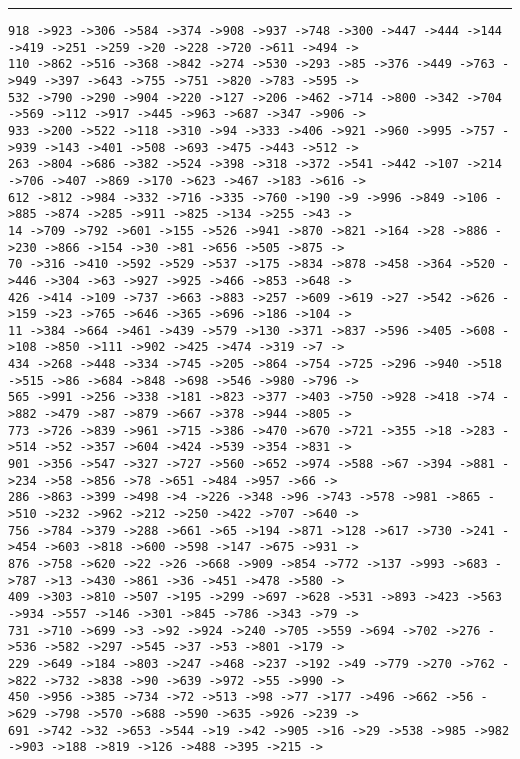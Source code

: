 \documentclass[letter, 12pt]{article}
\newenvironment{question}[1]{%
    \vspace{.2in}%
        \noindent{\bf #1}%
    \vspace{0.3em} \hrule \vspace{.1in}%
}{}
\begin{document}
\begin{question}{\large Appendix}
\begin{lstlisting}[style=CStyle]
918 ->923 ->306 ->584 ->374 ->908 ->937 ->748 ->300 ->447 ->444 ->144 ->419 ->251 ->259 ->20 ->228 ->720 ->611 ->494 ->
110 ->862 ->516 ->368 ->842 ->274 ->530 ->293 ->85 ->376 ->449 ->763 ->949 ->397 ->643 ->755 ->751 ->820 ->783 ->595 ->
532 ->790 ->290 ->904 ->220 ->127 ->206 ->462 ->714 ->800 ->342 ->704 ->569 ->112 ->917 ->445 ->963 ->687 ->347 ->906 ->
933 ->200 ->522 ->118 ->310 ->94 ->333 ->406 ->921 ->960 ->995 ->757 ->939 ->143 ->401 ->508 ->693 ->475 ->443 ->512 ->
263 ->804 ->686 ->382 ->524 ->398 ->318 ->372 ->541 ->442 ->107 ->214 ->706 ->407 ->869 ->170 ->623 ->467 ->183 ->616 ->
612 ->812 ->984 ->332 ->716 ->335 ->760 ->190 ->9 ->996 ->849 ->106 ->885 ->874 ->285 ->911 ->825 ->134 ->255 ->43 ->
14 ->709 ->792 ->601 ->155 ->526 ->941 ->870 ->821 ->164 ->28 ->886 ->230 ->866 ->154 ->30 ->81 ->656 ->505 ->875 ->
70 ->316 ->410 ->592 ->529 ->537 ->175 ->834 ->878 ->458 ->364 ->520 ->446 ->304 ->63 ->927 ->925 ->466 ->853 ->648 ->
426 ->414 ->109 ->737 ->663 ->883 ->257 ->609 ->619 ->27 ->542 ->626 ->159 ->23 ->765 ->646 ->365 ->696 ->186 ->104 ->
11 ->384 ->664 ->461 ->439 ->579 ->130 ->371 ->837 ->596 ->405 ->608 ->108 ->850 ->111 ->902 ->425 ->474 ->319 ->7 ->
434 ->268 ->448 ->334 ->745 ->205 ->864 ->754 ->725 ->296 ->940 ->518 ->515 ->86 ->684 ->848 ->698 ->546 ->980 ->796 ->
565 ->991 ->256 ->338 ->181 ->823 ->377 ->403 ->750 ->928 ->418 ->74 ->882 ->479 ->87 ->879 ->667 ->378 ->944 ->805 ->
773 ->726 ->839 ->961 ->715 ->386 ->470 ->670 ->721 ->355 ->18 ->283 ->514 ->52 ->357 ->604 ->424 ->539 ->354 ->831 ->
901 ->356 ->547 ->327 ->727 ->560 ->652 ->974 ->588 ->67 ->394 ->881 ->234 ->58 ->856 ->78 ->651 ->484 ->957 ->66 ->
286 ->863 ->399 ->498 ->4 ->226 ->348 ->96 ->743 ->578 ->981 ->865 ->510 ->232 ->962 ->212 ->250 ->422 ->707 ->640 ->
756 ->784 ->379 ->288 ->661 ->65 ->194 ->871 ->128 ->617 ->730 ->241 ->454 ->603 ->818 ->600 ->598 ->147 ->675 ->931 ->
876 ->758 ->620 ->22 ->26 ->668 ->909 ->854 ->772 ->137 ->993 ->683 ->787 ->13 ->430 ->861 ->36 ->451 ->478 ->580 ->
409 ->303 ->810 ->507 ->195 ->299 ->697 ->628 ->531 ->893 ->423 ->563 ->934 ->557 ->146 ->301 ->845 ->786 ->343 ->79 ->
731 ->710 ->699 ->3 ->92 ->924 ->240 ->705 ->559 ->694 ->702 ->276 ->536 ->582 ->297 ->545 ->37 ->53 ->801 ->179 ->
229 ->649 ->184 ->803 ->247 ->468 ->237 ->192 ->49 ->779 ->270 ->762 ->822 ->732 ->838 ->90 ->639 ->972 ->55 ->990 ->
450 ->956 ->385 ->734 ->72 ->513 ->98 ->77 ->177 ->496 ->662 ->56 ->629 ->798 ->570 ->688 ->590 ->635 ->926 ->239 ->
691 ->742 ->32 ->653 ->544 ->19 ->42 ->905 ->16 ->29 ->538 ->985 ->982 ->903 ->188 ->819 ->126 ->488 ->395 ->215 ->

\end{lstlisting}
\end{question}
\end{document}
